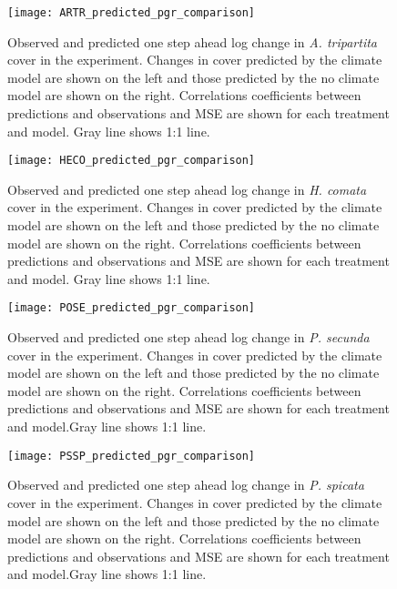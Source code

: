 \documentclass[11pt]{article}
\begin{document}
\begin{figure}[!htbp]
	\centering
	\texttt{[image: ARTR\_predicted\_pgr\_comparison]}
	\caption{Observed and predicted one step ahead log change in \textit{A. tripartita} cover in the experiment. Changes in cover predicted by the climate model are shown on the left and those predicted by the no climate model are shown on the right. Correlations coefficients between predictions and observations and MSE are shown for each treatment and model. Gray line shows 1:1 line.}
	\label{fig:pgrARTR}
\end{figure}

\begin{figure}[!htbp]
	\centering
	\texttt{[image: HECO\_predicted\_pgr\_comparison]}
	\caption{Observed and predicted one step ahead log change in \textit{H. comata} cover in the experiment. Changes in cover predicted by the climate model are shown on the left and those predicted by the no climate model are shown on the right. Correlations coefficients between predictions and observations and MSE are shown for each treatment and model. Gray line shows 1:1 line.}
	\label{fig:pgrHECO}
\end{figure}

\begin{figure}[!htbp]
	\centering
	\texttt{[image: POSE\_predicted\_pgr\_comparison]}
	\caption{Observed and predicted one step ahead log change in \textit{P. secunda} cover in the experiment. Changes in cover predicted by the climate model are shown on the left and those predicted by the no climate model are shown on the right. Correlations coefficients between predictions and observations and MSE are shown for each treatment and model.Gray line shows 1:1 line.}
	\label{fig:pgrPOSE}
\end{figure}

\begin{figure}[!htbp]
	\centering
	\texttt{[image: PSSP\_predicted\_pgr\_comparison]}
	\caption{Observed and predicted one step ahead log change in \textit{P. spicata} cover in the experiment. Changes in cover predicted by the climate model are shown on the left and those predicted by the no climate model are shown on the right. Correlations coefficients between predictions and observations and MSE are shown for each treatment and model.Gray line shows 1:1 line.}
	\label{fig:pgrPSSP}
\end{figure}
\end{document}
